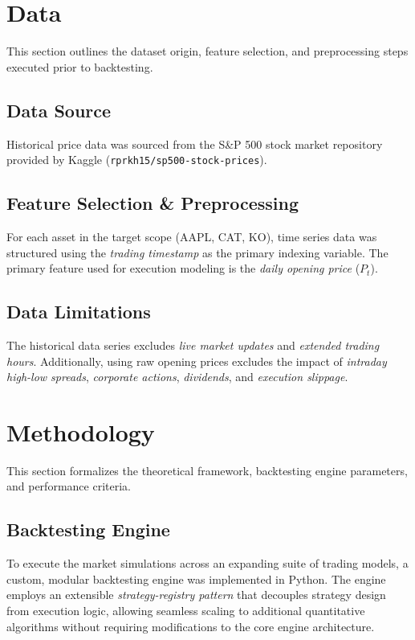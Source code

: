 \documentclass{article}
\begin{document}
\newpage

\section{Data}

This section outlines the dataset origin, feature selection, and preprocessing steps executed prior to backtesting.

\subsection{Data Source}
Historical price data was sourced from the S\&P 500 stock market repository provided by Kaggle (\texttt{rprkh15/sp500-stock-prices}).

\subsection{Feature Selection \& Preprocessing}
For each asset in the target scope (AAPL, CAT, KO), time series data was structured using the \textit{trading timestamp} as the primary indexing variable. The primary feature used for execution modeling is the \textit{daily opening price} ($P_t$).

\subsection{Data Limitations}
The historical data series excludes \textit{live market updates} and \textit{extended trading hours}. Additionally, using raw opening prices excludes the impact of \textit{intraday high-low spreads}, \textit{corporate actions}, \textit{dividends}, and \textit{execution slippage}.

\newpage

\section{Methodology}

This section formalizes the theoretical framework, backtesting engine parameters, and performance criteria.

\subsection{Backtesting Engine}
To execute the market simulations across an expanding suite of trading models, a custom, modular backtesting engine was implemented in Python. The engine employs an extensible \textit{strategy-registry pattern} that decouples strategy design from execution logic, allowing seamless scaling to additional quantitative algorithms without requiring modifications to the core engine architecture.
\end{document}
